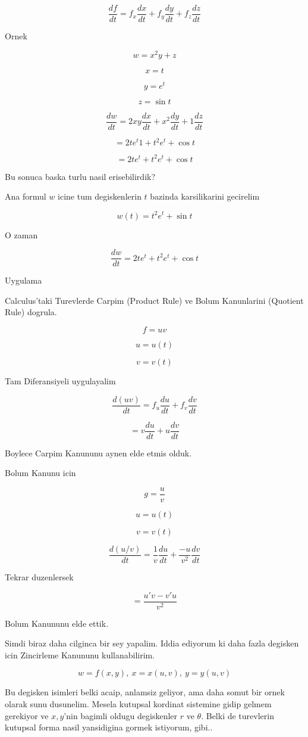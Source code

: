\documentclass[12pt,fleqn]{article}\usepackage{../common}
\begin{document}
\[ \frac{df}{dt} = f_x\frac{dx}{dt} + f_y\frac{dy}{dt} + f_z\frac{dz}{dt} \]

Ornek

\[ w = x^2y + z \]

\[ x = t \]

\[ y = e^t \]

\[ z = \sin t \]

\[ \frac{dw}{dt} = 2xy \frac{dx}{dt} + x^2 \frac{dy}{dt} + 1 \frac{dz}{dt}\]

\[ = 2te^t 1 + t^2e^t+\cos t \]

\[ = 2te^t + t^2e^t+\cos t \]

Bu sonuca baska turlu nasil erisebilirdik? 

Ana formul $w$ icine tum degiskenlerin $t$ bazinda karsilikarini gecirelim

\[ w(t) = t^2e^t + \sin t \]

O zaman

\[ \frac{dw}{dt} = 2te^t + t^2e^t + \cos t \]

Uygulama

Calculus'taki Turevlerde Carpim (Product Rule) ve Bolum Kanunlarini
(Quotient Rule) dogrula.

\[ f = uv \]

\[ u=u(t) \]

\[ v=v(t) \]

Tam Diferansiyeli uygulayalim

\[ \frac{d(uv)}{dt} = f_u\frac{du}{dt} + f_v \frac{dv}{dt}\]

\[  = v\frac{du}{dt} + u \frac{dv}{dt}\]

Boylece Carpim Kanununu aynen elde etmis olduk. 

Bolum Kanunu icin

\[ g = \frac{u}{v} \]

\[ u=u(t) \]

\[ v=v(t) \]

\[ \frac{d(u/v)}{dt} = \frac{1}{v} \frac{du}{dt} + \frac{-u}{v^2}\frac{dv}{dt}\]

Tekrar duzenlersek

\[ = \frac{u'v - v'u}{v^2} \]

Bolum Kanununu elde ettik.

Simdi biraz daha cilginca bir sey yapalim. Iddia ediyorum ki daha fazla
degisken icin Zincirleme Kanununu kullanabilirim. 

\[ w = f(x,y), \ x = x(u,v), \ y = y(u,v) \]

Bu degisken isimleri belki acaip, anlamsiz geliyor, ama daha somut bir
ornek olarak sunu dusunelim. Mesela kutupsal kordinat sistemine gidip
gelmem gerekiyor ve $x,y$'nin bagimli oldugu degiskenler $r$ ve
$\theta$. Belki de turevlerin kutupsal forma nasil yansidigina gormek
istiyorum, gibi..
\end{document}
